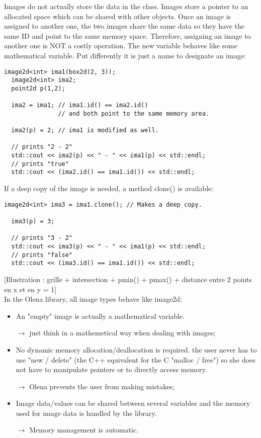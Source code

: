 \documentclass{report}
\begin{document}
Images do not actually store the data in the class. Images store a pointer
to an allocated space which can be shared with other objects. Once an image is
assigned to another one, the two images share the same data so they have the
same ID and point to the same memory space.
Therefore, assigning an image to another one is NOT a costly operation. The new
variable behaves like some mathematical variable.  Put differently it is just a
name to designate an image:
\begin{lstlisting}[frame=single]
  image2d<int> ima1(box2d(2, 3));
  image2d<int> ima2;
  point2d p(1,2);

  ima2 = ima1; // ima1.id() == ima2.id()
               // and both point to the same memory area.

  ima2(p) = 2; // ima1 is modified as well.

  // prints "2 - 2"
  std::cout << ima2(p) << " - " << ima1(p) << std::endl;
  // prints "true"
  std::cout << (ima2.id() == ima1.id()) << std::endl;
\end{lstlisting}

If a deep copy of the image is needed, a method clone() is available:
\begin{lstlisting}[frame=single]
  image2d<int> ima3 = ima1.clone(); // Makes a deep copy.

  ima3(p) = 3;

  // prints "3 - 2"
  std::cout << ima3(p) << " - " << ima1(p) << std::endl;
  // prints "false"
  std::cout << (ima3.id() == ima1.id()) << std::endl;
\end{lstlisting}

[Illustration : grille + intersection + pmin() + pmax() + distance entre 2
points en x et en y = 1]\\

In the Olena library, all image types behave like image2d:
\begin{itemize}
\item An "empty" image is actually a mathematical variable.

      $\rightarrow$ just think in a mathemetical way when dealing with images;

\item No dynamic memory allocation/deallocation is required.
    the user never has to use "new / delete" (the C++ equivalent for the C
    "malloc / free") so she does not have to manipulate pointers or to directly
    access memory.
    
    $\rightarrow$ Olena prevents the user from making mistakes;

\item Image data/values can be shared between several variables and the memory
    used for image data is handled by the library.
    
    $\rightarrow$ Memory management is automatic.
\end{itemize}
\end{document}
